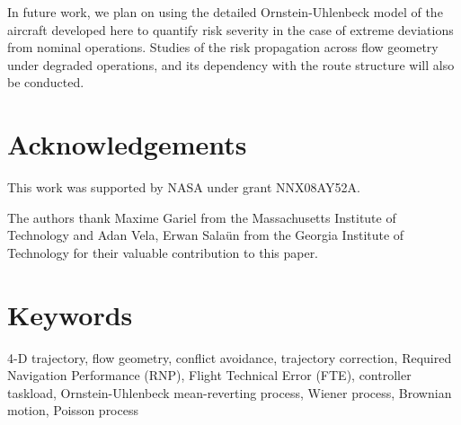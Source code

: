 \documentclass[conference]{IEEEtran}
\begin{document}
In future work, we plan on using the detailed Ornstein-Uhlenbeck model of the aircraft developed here to quantify risk severity in the case of extreme deviations from nominal operations. Studies of the risk propagation across flow geometry under degraded operations, and its dependency with the route structure will also be conducted.



\section*{Acknowledgements}

This work was supported by NASA under grant NNX08AY52A.

The authors thank Maxime Gariel from the Massachusetts Institute of Technology and Adan Vela, Erwan Sala\"{u}n from the Georgia Institute of Technology for their valuable contribution to this paper.


















\section*{Keywords}
\scriptsize{4-D trajectory, flow geometry, conflict avoidance, trajectory correction, Required Navigation Performance (RNP), Flight Technical Error (FTE), controller taskload, Ornstein-Uhlenbeck mean-reverting process, Wiener process, Brownian motion, Poisson process}
\end{document}
